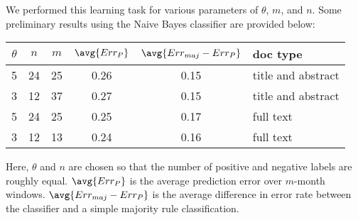 \documentclass[letterpaper]{article}
\begin{document}
We performed this learning task for various parameters of $\theta$, $m$, and $n$.  Some preliminary results using the Naive Bayes classifier are provided below: 
\begin{center}
\begin{tabular}{c c c | c  | c |  l}
$\theta$ & $n$ & $m$ &$ \avg{Err_P}$ &$ \avg{Err_{maj} -Err_P} $& doc type \\
\hline
5 & 24 & 25 & 0.26 & 0.15 & title and abstract \\
3 & 12 & 37 & 0.27 & 0.15 & title and abstract \\
5 & 24 & 25 & 0.25 & 0.17 & full text \\
3 & 12 & 13 & 0.24 & 0.16 &  full text \\

\end{tabular}
\end{center}
Here, $\theta$ and $n$ are chosen so that the number of positive and negative labels are roughly equal.  $\avg{Err_P}$ is the average prediction error over $m$-month windows.   $ \avg{Err_{maj} -Err_P} $ is the average difference in error rate between the classifier and a simple majority rule classification.
\end{document}
